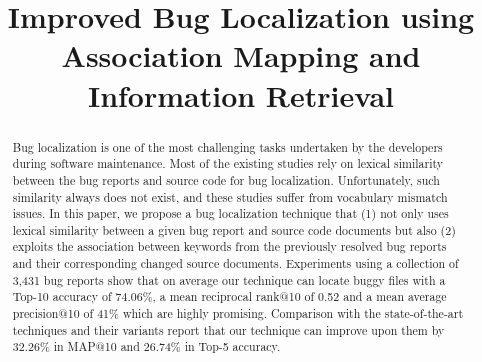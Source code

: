 \documentclass[conference]{IEEEtran}
\let\footnotesize\scriptsize
\begin{document}
\title{Improved Bug Localization using Association Mapping and Information Retrieval\\
}



\maketitle

\begin{abstract}
Bug localization is one of the most challenging tasks undertaken by the developers during software maintenance.
Most of the existing studies rely on lexical similarity between the bug reports and source code for bug localization.
Unfortunately, such similarity always does not exist, and these studies suffer from vocabulary mismatch issues.
In this paper, we propose a bug localization technique that (1) not only uses lexical similarity between a given bug report and source code documents  
but also (2) exploits the association between keywords from the previously resolved bug reports and their corresponding changed source documents.
Experiments using a collection of 3,431 bug reports show that on average our technique can locate buggy files with a Top-10 accuracy of 74.06\%, a mean reciprocal rank@10 of 0.52 and a mean average precision@10 of 41\% which are highly promising. 
Comparison with the state-of-the-art techniques
and their variants report that our technique can improve upon them by 32.26\% in MAP@10 and 26.74\% in Top-5 accuracy. 
\end{abstract}
\end{document}
